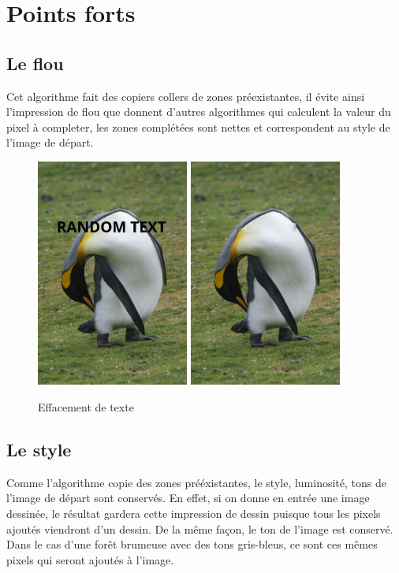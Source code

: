 \section{Points forts}
\subsection{Le flou}
Cet algorithme fait des copiers collers de zones préexistantes, il évite
ainsi l'impression de flou que donnent d'autres algorithmes qui calculent
la valeur du pixel à completer, les zones complétées sont nettes et 
correspondent au style de l'image de départ.

\begin{figure}[ht]
\centering
\includegraphics[height=7.5cm]{img/examples/penguin.jpg}
\includegraphics[height=7.5cm]{img/examples/penguin_res.jpg}
\caption{Effacement de texte}
\end{figure}

\subsection{Le style}
Comme l'algorithme copie des zones prééxistantes, le style, luminosité, tons
de l'image de départ sont conservés. En effet, si on donne en entrée une
image dessinée, le résultat gardera cette impression de dessin puisque tous
les pixels ajoutés viendront d'un dessin. 
De la même façon, le ton de l'image est conservé. Dans le cas d'une forêt 
brumeuse avec des tons gris-bleus, ce sont ces mêmes pixels qui seront 
ajoutés à l'image.

